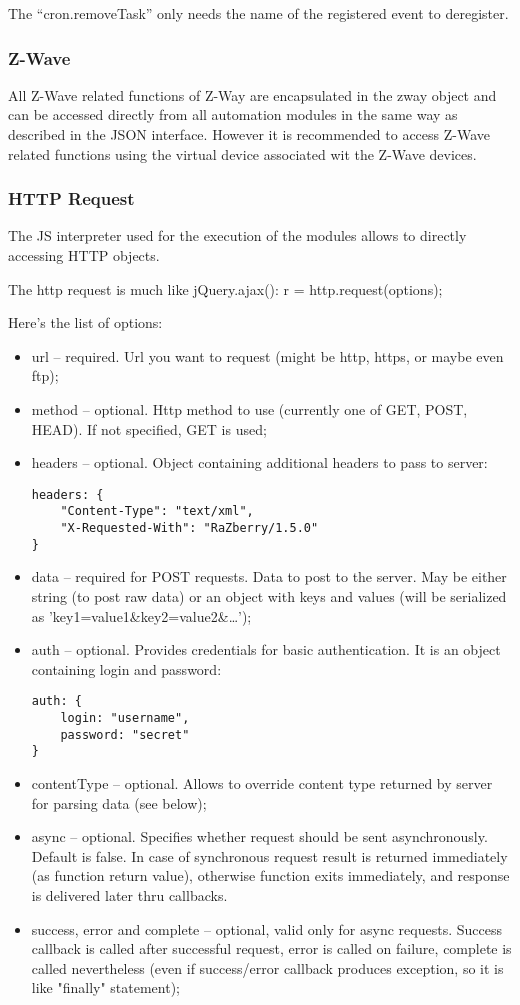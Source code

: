 The “cron.removeTask” only needs the name of the registered event to deregister.

\subsubsection{Z-Wave}

All Z-Wave related functions of Z-Way are encapsulated in the zway object and can be accessed directly from all automation modules in the same way as described in the JSON interface. However it is recommended to access Z-Wave related functions using the virtual device associated wit the Z-Wave devices.

\subsubsection{HTTP Request}

The JS interpreter used for the execution of the modules allows to directly accessing HTTP
objects.

The http request is much like jQuery.ajax(): r = http.request(options);


Here's the list of options:
\begin{itemize}
\item url – required. Url you want to request (might be http, https, or maybe even ftp);
\item method – optional. Http method to use (currently one of GET, POST, HEAD). If not specified, GET is used;
\item headers – optional. Object containing additional headers to pass to server:

\begin{lstlisting}
headers: {
    "Content-Type": "text/xml",
    "X-Requested-With": "RaZberry/1.5.0"
}
\end{lstlisting}

\item data – required for POST requests. Data to post to the server. May be either string (to post raw data) or an object with keys and values (will be serialized as 'key1=value1\&key2=value2\&…');
\item auth – optional. Provides credentials for basic authentication. It is an object containing login and password:
\begin{lstlisting}
auth: {
    login: "username",
    password: "secret"
}
\end{lstlisting}
\item contentType – optional. Allows to override content type returned by server for parsing data (see below);
\item async – optional. Specifies whether request should be sent asynchronously. Default is false. In case of synchronous request result is returned immediately (as function return value), otherwise function exits immediately, and response is delivered later thru callbacks.
\item success, error and complete – optional, valid only for async requests. Success callback is called after successful request, error is called on failure, complete is called nevertheless (even if success/error callback produces exception, so it is like "finally" statement);
\end{itemize}

